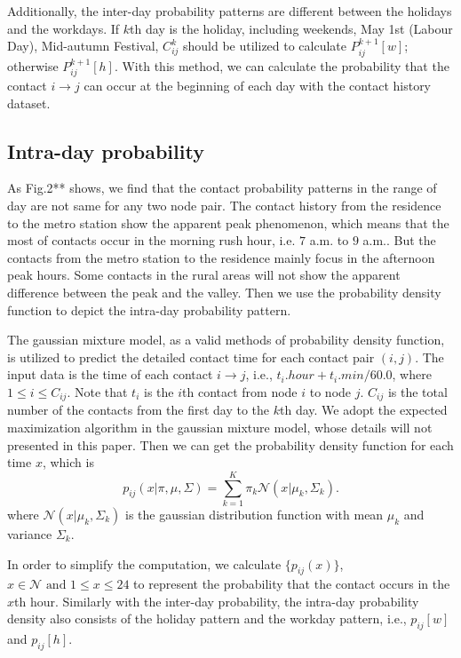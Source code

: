 Additionally, the inter-day probability patterns are different between the holidays and the workdays.
If $k$th day is the holiday, including weekends, May 1st (Labour Day), Mid-autumn Festival,
$C^{k}_{i j}$ should be utilized to calculate $P^{k+1}_{i j}[w]$;
otherwise $P^{k+1}_{i j}[h]$.
With this method, we can calculate the probability that the contact $i \rightarrow j$ can occur
at the beginning of each day with the contact history dataset.

\subsection{Intra-day probability}
As Fig.2** shows,
we find that the contact probability patterns in the range of day
are not same for any two node pair.
The contact history from the residence to the metro station
show the apparent peak phenomenon,
which means that the most of contacts occur in the morning rush hour, i.e. $7$ a.m. to $9$ a.m..
But the contacts from the metro station to the residence
mainly focus in the afternoon peak hours.
Some contacts in the rural areas will not show the apparent difference between the peak and the valley.
Then we use the probability density function to depict the intra-day probability pattern.

The gaussian mixture model, as a valid methods of probability density function,
is utilized to predict the detailed contact time for each contact pair $(i, j)$.
The input data is the time of each contact $i \rightarrow j$, i.e., $t_{i}.hour+t_{i}.min/60.0$,
where $1 \le i \le C_{ij}$.
Note that $t_{i}$ is the $i$th contact from node $i$ to node $j$.
$C_{ij}$ is the total number of the contacts from the first day to the $k$th day.
We adopt the expected maximization algorithm in the gaussian mixture model,
whose details will not presented in this paper.
Then we can get the probability density function for each time $x$, which is
\begin{equation}
\label{eq:prob_GMM}
p_{i j}(x | \pi, \mu, \Sigma) = \sum_{k=1}^{K} \pi_{k} \mathcal{N}(x|\mu_{k}, \Sigma_{k}).
\end{equation}
where $\mathcal{N}(x|\mu_{k}, \Sigma_{k})$ is the gaussian distribution function 
with mean $\mu_{k}$ and variance $\Sigma_{k}$.

In order to simplify the computation,
we calculate $\{p_{i j}(x)\}$, $x \in \mathcal{N} \text{ and } 1 \le x \le 24$
to represent the probability that the contact occurs in the $x$th hour.
Similarly with the inter-day probability, 
the intra-day probability density also consists of the holiday pattern
and the workday pattern, i.e., $p_{i j}[w]$ and $p_{i j}[h]$.

